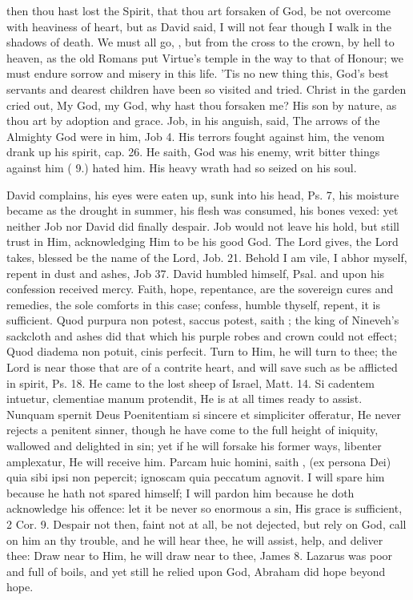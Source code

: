 {then thou hast lost the Spirit, that thou art forsaken of God, be not
overcome with heaviness of heart, but as David said, I will not fear
though I walk in the shadows of death. We must all go, , but from the cross to the crown, by hell to heaven,
as the old Romans put Virtue's temple in the way to that of Honour; we
must endure sorrow and misery in this life. 'Tis no new thing this,
God's best servants and dearest children have been so visited and
tried. Christ in the garden cried out, My God, my God, why hast thou
forsaken me? His son by nature, as thou art by adoption and grace. Job,
in his anguish, said, The arrows of the Almighty God were in him, Job
 4. His terrors fought against him, the venom drank up his spirit,
cap.  26. He saith, God was his enemy, writ bitter things against
him ( 9.) hated him. His heavy wrath had so seized on his soul.

David complains, his eyes were eaten up, sunk into his head, Ps.  7,
his moisture became as the drought in summer, his flesh was consumed,
his bones vexed: yet neither Job nor David did finally despair. Job
would not leave his hold, but still trust in Him, acknowledging Him to
be his good God. The Lord gives, the Lord takes, blessed be the name of
the Lord, Job.  21. Behold I am vile, I abhor myself, repent in dust
and ashes, Job  37. David humbled himself, Psal.  and upon
his confession received mercy. Faith, hope, repentance, are the
sovereign cures and remedies, the sole comforts in this case; confess,
humble thyself, repent, it is sufficient. Quod purpura non potest,
saccus potest, saith \Chrysostom{}; the king of Nineveh's sackcloth and
ashes did that which his purple robes and crown could not effect; Quod
diadema non potuit, cinis perfecit. Turn to Him, he will turn to thee;
the Lord is near those that are of a contrite heart, and will save such
as be afflicted in spirit, Ps.  18. He came to the lost sheep of
Israel, Matt.  14. Si cadentem intuetur, clementiae manum protendit,
He is at all times ready to assist. Nunquam spernit Deus Poenitentiam
si sincere et simpliciter offeratur, He never rejects a penitent
sinner, though he have come to the full height of iniquity, wallowed
and delighted in sin; yet if he will forsake his former ways, libenter
amplexatur, He will receive him. Parcam huic homini, saith
\Austin{}, (ex persona Dei) quia sibi ipsi non pepercit; ignoscam
quia peccatum agnovit. I will spare him because he hath not spared
himself; I will pardon him because he doth acknowledge his offence: let
it be never so enormous a sin, His grace is sufficient, 2 Cor.  9.
Despair not then, faint not at all, be not dejected, but rely on God,
call on him an thy trouble, and he will hear thee, he will assist,
help, and deliver thee: Draw near to Him, he will draw near to thee,
James  8. Lazarus was poor and full of boils, and yet still he
relied upon God, Abraham did hope beyond hope.

}
